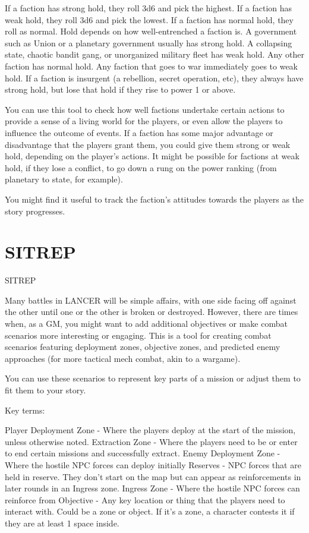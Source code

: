 If a faction has strong hold, they roll 3d6 and pick the highest. If a faction has weak hold, they roll  
3d6 and pick the lowest. If a faction has normal hold, they roll as normal. Hold depends on how  
well-entrenched a faction is. A government such as Union or a planetary government usually has  
strong hold. A collapsing state, chaotic bandit gang, or unorganized military fleet has weak hold.  
Any other faction has normal hold. Any faction that goes to war immediately goes to weak hold. If  
a faction is insurgent (a rebellion, secret operation, etc), they always have strong hold, but lose  
that hold if they rise to power 1 or above.  

You can use this tool to check how well factions undertake certain actions to provide a sense of a  
living world for the players, or even allow the players to influence the outcome of events. If a  
faction has some major advantage or disadvantage that the players grant them, you could give  
them strong or weak hold, depending on the player’s actions. It might be possible for factions at  
weak hold, if they lose a conflict, to go down a rung on the power ranking (from planetary to state,  
for example).  

You might find it useful to track the faction’s attitudes towards the players as the story progresses.  

\chapter{SITREP}


                                              SITREP   

Many battles in LANCER will be simple affairs, with one side facing off against the other until one  
or the other is broken or destroyed. However, there are times when, as a GM, you might want to  
add additional objectives or make combat scenarios more interesting or engaging. This is a tool  
for creating combat scenarios featuring deployment zones, objective zones, and predicted enemy  
approaches (for more tactical mech combat, akin to a wargame).   

You can use these scenarios to represent key parts of a mission or adjust them to fit them to your  
story.  

Key terms:  

Player Deployment Zone - Where the players deploy at the start of the mission, unless otherwise  
noted.   
Extraction Zone - Where the players need to be or enter to end certain missions and  
successfully extract.   
Enemy Deployment Zone - Where the hostile NPC forces can deploy initially  
Reserves - NPC forces that are held in reserve. They don’t start on the map but can appear as  
reinforcements in later rounds in an Ingress zone.  
Ingress Zone - Where the hostile NPC forces can reinforce from  
Objective - Any key location or thing that the players need to interact with. Could be a zone or  
object. If it’s a zone, a character contests it if they are at least 1 space inside.  

